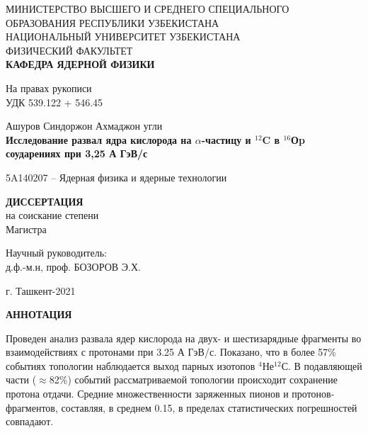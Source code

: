 \documentclass[fontsize=14pt]{scrarticle}
\begin{document}
	\begin{titlepage}
		\begin{center}
 	МИНИСТЕРСТВО ВЫСШЕГО И СРЕДНЕГО СПЕЦИАЛЬНОГО ОБРАЗОВАНИЯ РЕСПУБЛИКИ УЗБЕКИСТАНА\\ 
 	
 	НАЦИОНАЛЬНЫЙ  УНИВЕРСИТЕТ УЗБЕКИСТАНА\\ ФИЗИЧЕСКИЙ ФАКУЛЬТЕТ \\\textbf{КАФЕДРА ЯДЕРНОЙ ФИЗИКИ}\\  
	\begin{flushright}
			\small{На правах рукописи}\\
           \small{ УДК 539.122 + 546.45 }
			\end{flushright}
			\vfill

\textrm{Ашуров Синдоржон Ахмаджон угли}	\\		
			\large \textbf{Исследование развал ядра кислорода на $\alpha$-частицу и $^{12}$C в $^{16}$Оp соударениях при 3,25 А ГэВ/с }
			
		\end{center}
\begin{center}
5A140207 -- Ядерная физика и ядерные технологии
\end{center}
         \vfill
         \begin{center}
         \textbf{ДИССЕРТАЦИЯ}\\
         на соискание степени\\
         Магистра
         \end{center}
         
         \begin{flushright}
Научный руководитель:\\
д.ф.-м.н, проф. БОЗОРОВ Э.Х.
         \end{flushright}
		\vfill
		
		\vfill
		\begin{center}
			г. Ташкент-2021
		\end{center}
	\end{titlepage}
	\newpage
	\makenomenclature 
	\renewcommand{\nomname}{Перечень условных обозначений}
    \newcommand*{\nom}[2]{#1\nomenclature{#1}{#2}}
	\printnomenclature[5em]
	\newpage
	\renewcommand{\contentsname}{Содержание}

	\thispagestyle{plain}
\begin{center}
    \large
    \textbf{АННОТАЦИЯ}\\
    \vspace{0.4cm}

\end{center}
	\hspace{0.6cm}
   Проведен анализ развала ядер кислорода на двух- и шестизарядные фрагменты во взаимодействиях с протонами при 3.25 А ГэВ/с. Показано, что в более 57\% событиях топологии  наблюдается выход парных изотопов $^{4}$Не$^{12}$С. В подавляющей части ($\approx$82\%) событий рассматриваемой топологии происходит сохранение протона отдачи. Средние множественности заряженных пионов и протонов-фрагментов, составляя, в среднем 0.15, в пределах статистических погрешностей совпадают. 
   
\end{document}
